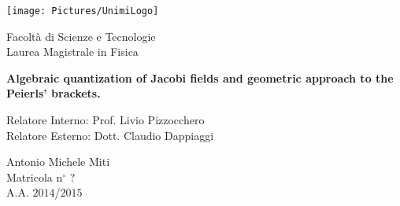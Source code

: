 \begin{titlepage}

{
\thispagestyle{empty}

\centerline{
\texttt{[image: Pictures/UnimiLogo]}
}

\begin{center}
{\Large Facoltà di Scienze e Tecnologie\\
\vskip0.2cm Laurea Magistrale in Fisica }
\end{center}


\vskip1.5cm
\begin{center}
{\huge \textbf{Algebraic quantization of Jacobi fields and geometric approach to the Peierls' brackets.}}
\end{center}

{\large
\vskip20mm Relatore Interno:  Prof. Livio Pizzocchero \\
						Relatore Esterno: Dott. Claudio Dappiaggi
}

\vskip2cm
\hskip9cm\parbox[t]{7cm}
{\large 
Antonio Michele Miti\\
Matricola n$^\circ$ $?$\\
A.A. $2014$/$2015$\\
}

\newpage
\newpage
\thispagestyle{empty}
\clearpage
}

\end{titlepage}
